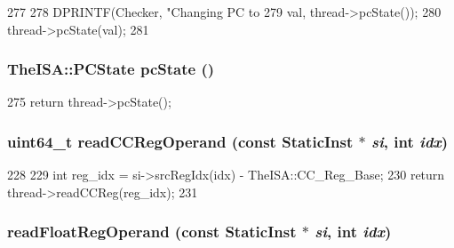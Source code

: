 \begin{DoxyCode}
277     {
278         DPRINTF(Checker, "Changing PC to %
279                          val, thread->pcState());
280         thread->pcState(val);
281     }
\end{DoxyCode}
\hypertarget{classCheckerCPU_a827fb3454585cf4c620f4fd341966317}{
\subsubsection[{pcState}]{\setlength{\rightskip}{0pt plus 5cm}TheISA::PCState pcState ()}}
\label{classCheckerCPU_a827fb3454585cf4c620f4fd341966317}



\begin{DoxyCode}
275 { return thread->pcState(); }
\end{DoxyCode}
\hypertarget{classCheckerCPU_a25532f176443f0ec538a3b833c55f4a0}{
\subsubsection[{readCCRegOperand}]{\setlength{\rightskip}{0pt plus 5cm}uint64\_\-t readCCRegOperand (const {\bf StaticInst} $\ast$ {\em si}, \/  int {\em idx})}}
\label{classCheckerCPU_a25532f176443f0ec538a3b833c55f4a0}



\begin{DoxyCode}
228     {
229         int reg_idx = si->srcRegIdx(idx) - TheISA::CC_Reg_Base;
230         return thread->readCCReg(reg_idx);
231     }
\end{DoxyCode}
\hypertarget{classCheckerCPU_a717c88c8c56d79c9ed554ba5992bd8c3}{
\subsubsection[{readFloatRegOperand}]{ readFloatRegOperand (const {\bf StaticInst} $\ast$ {\em si}, \/  int {\em idx})}}
\label{classCheckerCPU_a717c88c8c56d79c9ed554ba5992bd8c3}



